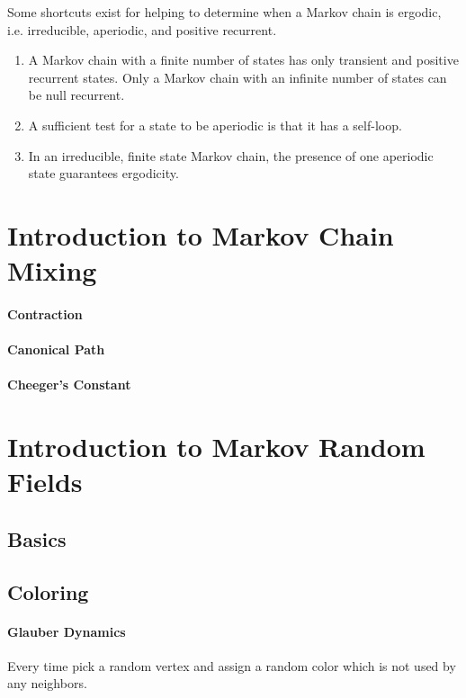 \begin{remark}
    Some shortcuts exist for helping to determine when a Markov chain is ergodic, i.e. irreducible, aperiodic, and positive recurrent.
    \begin{enumerate}
        \item A Markov chain with a finite number of states has only transient and positive recurrent states. Only a Markov chain with an infinite number of
        states can be null recurrent.
        \item A sufficient test for a state to be aperiodic is that it has a self-loop.
        \item In an irreducible, finite state Markov chain, the presence of one aperiodic
        state guarantees ergodicity.
    \end{enumerate}
\end{remark}

\section{Introduction to Markov Chain Mixing}

\paragraph{Contraction}

\paragraph{Canonical Path}

\paragraph{Cheeger's Constant}



\section{Introduction to Markov Random Fields}
\subsection{Basics}


\subsection{Coloring}

\paragraph{Glauber Dynamics}
Every time pick a random vertex and assign a random color which is not used by any neighbors.


